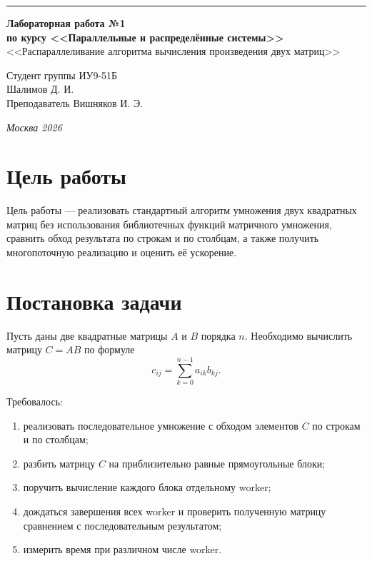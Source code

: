 \documentclass[a4paper,14pt]{extarticle}
\begin{document}
\begin{titlepage}
\vspace*{-16pt}
\hspace{30pt}\rule{0.866\textwidth}{0.4pt}

\vspace{11em}

\begin{center}
\Large \textbf{Лабораторная работа №1} \\
\large \textbf{по курсу <<Параллельные и распределённые системы>>} \\
\large <<Распараллеливание алгоритма вычисления произведения двух матриц>>
\end{center}

\normalsize

\vspace{8em}

\begin{flushright}
Студент группы ИУ9-51Б \\
Шалимов Д. И. \\
\vspace{2ex}
Преподаватель Вишняков И. Э.
\end{flushright}

\bigskip
\vfill

\begin{center}
\textsl{Москва 2026}
\end{center}
\end{titlepage}

\setcounter{page}{2}
\tableofcontents
\newpage

\section{Цель работы}

Цель работы --- реализовать стандартный алгоритм умножения двух квадратных
матриц без использования библиотечных функций матричного умножения, сравнить
обход результата по строкам и по столбцам, а также получить многопоточную
реализацию и оценить её ускорение.

\section{Постановка задачи}

Пусть даны две квадратные матрицы $A$ и $B$ порядка $n$. Необходимо вычислить
матрицу $C = AB$ по формуле
\[
    c_{ij} = \sum_{k=0}^{n-1} a_{ik}b_{kj}.
\]

Требовалось:
\begin{enumerate}
    \item реализовать последовательное умножение с обходом элементов $C$ по
    строкам и по столбцам;
    \item разбить матрицу $C$ на приблизительно равные прямоугольные блоки;
    \item поручить вычисление каждого блока отдельному worker;
    \item дождаться завершения всех worker и проверить полученную матрицу
    сравнением с последовательным результатом;
    \item измерить время при различном числе worker.
\end{enumerate}
\end{document}

